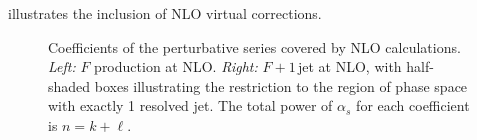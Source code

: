  illustrates the inclusion of NLO
virtual corrections. 
\begin{figure}[t]
\begin{center}%
\caption{Coefficients of the perturbative series covered by NLO calculations. 
{\sl Left:} 
   $F$ production at NLO. {\sl Right:} $F+1\,$jet at NLO, with
  half-shaded boxes illustrating the restriction to the region of phase
  space with exactly 1 resolved jet.
  The total power of $\alpha_s$ for each coefficient is $n = k+\ell$.
\label{fig:loopsnlegs2}}
\end{center}
\end{figure}
